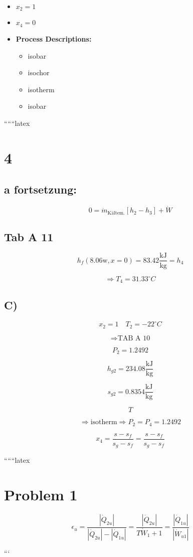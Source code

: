 \begin{itemize}
    \item \( x_2 = 1 \)
    \item \( x_4 = 0 \)
\end{itemize}

\begin{itemize}
    \item \textbf{Process Descriptions:}
    \begin{itemize}
        \item isobar
        \item isochor
        \item isotherm
        \item isobar
    \end{itemize}
\end{itemize}

``````latex

\section*{4}

\subsection*{a fortsetzung:}

\[
0 = \dot{m}_{\text{Kältem.}} \left[ h_2 - h_3 \right] + \dot{W}
\]

\subsection*{Tab A 11}

\[
h_f(8.06 \text{w}, x=0) = 83.42 \frac{\text{kJ}}{\text{kg}} = h_4
\]

\[
\Rightarrow T_4 = 31.33^\circ C
\]

\subsection*{C)}

\[
x_2 = 1 \quad T_2 = -22^\circ C
\]

\[
\Rightarrow \text{TAB A 10}
\]

\[
P_2 = 1.2492
\]

\[
h_{g2} = 234.08 \frac{\text{kJ}}{\text{kg}}
\]

\[
s_{g2} = 0.8354 \frac{\text{kJ}}{\text{kg}}
\]

\[
T
\]

\[
\Rightarrow \text{isotherm} \Rightarrow P_2 = P_4 = 1.2492
\]

\[
x_4 = \frac{s - s_f}{s_{g} - s_f} = \frac{s - s_f}{s_{g} - s_f}
\]

``````latex

\section*{Problem 1}

\[
\epsilon_u = \frac{\left| \dot{Q}_{2u} \right|}{\left| \dot{Q}_{2u} \right| - \left| \dot{Q}_{1u} \right|} = \frac{\left| \dot{Q}_{2u} \right|}{T \dot{W}_{1} + 1} = \frac{\left| \dot{Q}_{1u} \right|}{\left| \dot{W}_{u1} \right|}
\]

```